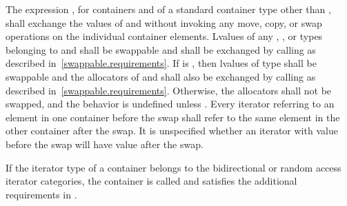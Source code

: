 \pnum
The expression , for containers  and  of a standard
container type other than , shall exchange the values of  and
 without invoking any move, copy, or swap operations on the individual
container elements.
Lvalues of any , , or  types
belonging to  and  shall be swappable
and shall be exchanged by calling 
as described in~\ref{swappable.requirements}. If
 is
, then
lvalues of type  shall be swappable and
the allocators of  and  shall also be exchanged
by calling  as described in~\ref{swappable.requirements}.
Otherwise, the allocators shall not be swapped, and the behavior is
undefined unless . Every iterator
referring to an element in one container before the swap shall refer to the same
element in the other container after the swap. It is unspecified whether an iterator
with value  before the swap will have value  after the
swap.

\pnum
If the iterator type of a container belongs to the bidirectional or
random access iterator categories,
the container is called
and satisfies the additional requirements
in .

